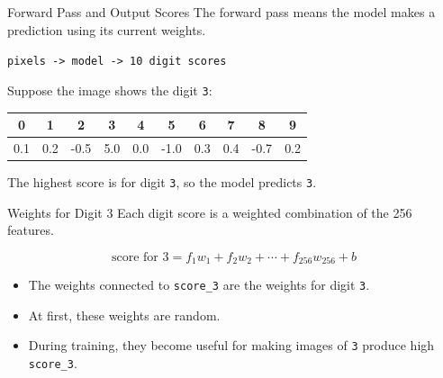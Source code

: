 \documentclass{beamer}
\begin{document}
\begin{frame}{Forward Pass and Output Scores}
\small
The forward pass means the model makes a prediction using its current weights.

\vspace{0.25cm}

\begin{center}
\texttt{pixels -> model -> 10 digit scores}
\end{center}

\vspace{0.25cm}

Suppose the image shows the digit \texttt{3}:

\vspace{0.15cm}

\begin{center}
\begin{tabular}{c c c c c c c c c c}
0 & 1 & 2 & 3 & 4 & 5 & 6 & 7 & 8 & 9 \\
\midrule
0.1 & 0.2 & -0.5 & 5.0 & 0.0 & -1.0 & 0.3 & 0.4 & -0.7 & 0.2
\end{tabular}
\end{center}

The highest score is for digit \texttt{3}, so the model predicts \texttt{3}.
\end{frame}

\begin{frame}{Weights for Digit 3}
\small
Each digit score is a weighted combination of the 256 features.

\[
\text{score for 3}
=
f_1w_1 + f_2w_2 + \cdots + f_{256}w_{256} + b
\]

\vspace{0.2cm}

\begin{itemize}
    \item The weights connected to \texttt{score\_3} are the weights for digit \texttt{3}.
    \item At first, these weights are random.
    \item During training, they become useful for making images of \texttt{3} produce high \texttt{score\_3}.
\end{itemize}
\end{frame}
\end{document}
